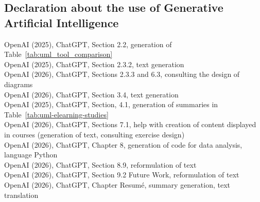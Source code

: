 \documentclass[11pt,a4paper,twoside,openright,english]{book}
\begin{document}
\begin{refsegment}
\chapter*{Declaration about the use of Generative Artificial Intelligence}
OpenAI (2025), ChatGPT, Section 2.2, generation of Table~\ref{tab:uml_tool_comparison}\\
OpenAI (2025), ChatGPT, Section 2.3.2, text generation\\
OpenAI (2026), ChatGPT, Sections 2.3.3 and 6.3, consulting the design of diagrams\\
OpenAI (2026), ChatGPT, Section 3.4, text generation\\
OpenAI (2025), ChatGPT, Section, 4.1, generation of summaries in Table~\ref{tab:uml-elearning-studies}\\
OpenAI (2026), ChatGPT, Sections 7.1, help with creation of content displayed in courses (generation of text, consulting exercise design)\\
OpenAI (2026), ChatGPT, Chapter 8, generation of code for data analysis, language Python\\
OpenAI (2026), ChatGPT, Section 8.9, reformulation of text\\
OpenAI (2026), ChatGPT, Section 9.2 Future Work, reformulation of text\\
OpenAI (2026), ChatGPT, Chapter Resumé, summary generation, text translation\\

\end{refsegment}


\appendix
% 
% 



\end{document}
